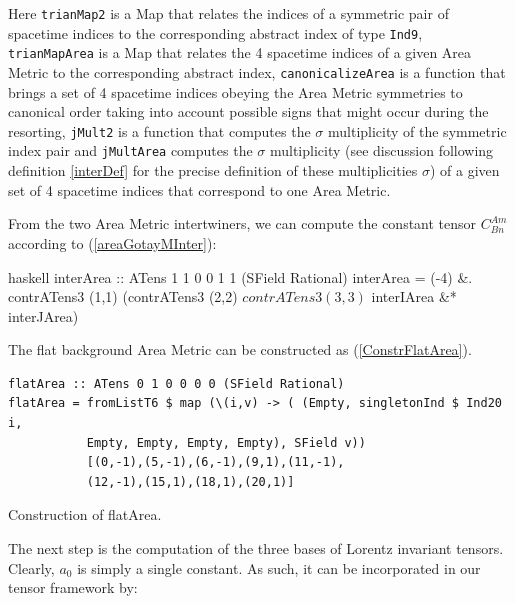 \documentclass[a4paper,12pt, DIV=14, BCOR=5mm, twoside, headsepline, numbers=noenddot]{scrbook}
\begin{document}
Here \texttt{trianMap2} is a Map that relates the indices of a symmetric pair of spacetime indices to the corresponding abstract index of type \texttt{Ind9}, \texttt{trianMapArea} is a Map that relates the 4 spacetime indices of a given Area Metric to the corresponding abstract index, \texttt{canonicalizeArea} is a function that brings a set of 4 spacetime indices obeying the Area Metric symmetries to canonical order taking into account possible signs that might occur during the resorting, \texttt{jMult2} is a function that computes the $\sigma$ multiplicity of the symmetric index pair and \texttt{jMultArea} computes the $\sigma$ multiplicity (see discussion following definition \ref{interDef} for the precise definition of these multiplicities $\sigma$) of a given set of 4 spacetime indices that correspond to one Area Metric.

From the two Area Metric intertwiners, we can compute the constant tensor $C^{Am}_{Bn}$ according to (\ref{areaGotayMInter}):

\begin{center}
\begin{cminted}{haskell}
interArea :: ATens 1 1 0 0 1 1 (SField Rational)
interArea = (-4) &. contrATens3 (1,1) (contrATens3 (2,2) $
            contrATens3 (3,3) $ interIArea &* interJArea)
\end{cminted}
\end{center}

The flat background Area Metric can be constructed as (\ref{ConstrFlatArea}).

\begin{listing}[hbt!]
\begin{verbatim}
flatArea :: ATens 0 1 0 0 0 0 (SField Rational)
flatArea = fromListT6 $ map (\(i,v) -> ( (Empty, singletonInd $ Ind20 i,
           Empty, Empty, Empty, Empty), SField v))
           [(0,-1),(5,-1),(6,-1),(9,1),(11,-1),
           (12,-1),(15,1),(18,1),(20,1)]
\end{verbatim} 
\caption{Construction of flatArea.}\label{ConstrFlatArea}
\end{listing}

The next step is the computation of the three bases of Lorentz invariant tensors. Clearly, $a_0$ is simply a single constant. As such, it can be incorporated in our tensor framework by:

\begin{center}
\end{center}
\end{document}
